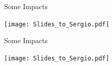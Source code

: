 \documentclass[10pt,t]{beamer}
\begin{document}
\begin{frame}{Some Impacts}
\vspace{-0.35in}
\begin{center}
\texttt{[image: Slides\_to\_Sergio.pdf]}
\end{center}
\end{frame}

\begin{frame}{Some Impacts}
\vspace{-0.35in}
\begin{center}
\texttt{[image: Slides\_to\_Sergio.pdf]}
\end{center}
\end{frame}
\end{document}
